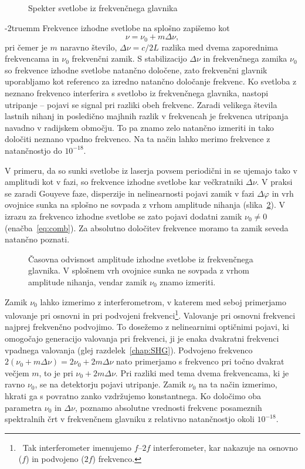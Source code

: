 \begin{figure}[ht]
\centering
\def\svgwidth{100truemm} 

\caption{Spekter svetlobe iz frekvenčnega glavnika}
\label{fig:comb}
\end{figure}
\vglue-2truemm
Frekvence izhodne svetlobe na splošno zapišemo kot 
\begin{equation}
\nu = \nu_0 + m\Delta \nu,
\label{eq:comb}
\end{equation}
pri čemer je $m$ naravno število, $\Delta \nu = c/2L$ razlika med dvema zaporednima 
frekvencama in $\nu_0$ frekvenčni zamik. S stabilizacijo $\Delta \nu$ in 
frekvenčnega zamika $\nu_0$ so frekvence izhodne svetlobe  
natančno določene, zato frekvenčni glavnik uporabljamo kot referenco 
za izredno natančno določanje frekvenc. Ko svetloba z neznano frekvenco
interferira s svetlobo iz frekvenčnega glavnika, nastopi utripanje -- pojavi
se signal pri razliki obeh frekvenc. Zaradi velikega števila lastnih nihanj 
in posledično majhnih razlik v frekvencah je frekvenca utripanja navadno v 
radijskem območju. To pa znamo zelo natančno izmeriti in tako določiti neznano 
vpadno frekvenco. Na ta način lahko merimo frekvence z natančnostjo do 
$10^{-18}$.

V primeru, da so sunki svetlobe iz laserja povsem periodični in se ujemajo tako
v amplitudi kot v fazi, so frekvence izhodne svetlobe kar 
večkratniki $\Delta \nu$. V praksi se zaradi Gouyeve faze,
disperzije in nelinearnosti pojavi zamik
v fazi $\Delta \varphi$ in vrh ovojnice sunka na splošno ne sovpada z vrhom amplitude
nihanja (slika~\ref{fig:comb2}). V izrazu za
frekvenco izhodne svetlobe se zato pojavi dodatni zamik $\nu_0 \neq 0$ (enačba~\ref{eq:comb}). 
Za absolutno
določitev frekvence moramo ta zamik seveda natančno poznati. 
\begin{figure}[ht]
\centering
\def\svgwidth{110truemm} 

\caption{Časovna odvisnost amplitude izhodne svetlobe iz frekvenčnega glavnika. V splošnem
vrh ovojnice sunka ne sovpada z vrhom amplitude nihanja, vendar zamik $\nu_0$ znamo izmeriti.}
\label{fig:comb2}
\end{figure}

Zamik $\nu_0$ lahko izmerimo
z interferometrom, v katerem med seboj primerjamo valovanje pri 
osnovni in pri podvojeni frekvenci\footnote{~Tak interferometer imenujemo $f$--$2f$
interferometer, kar nakazuje na osnovno ($f$)  in podvojeno ($2f$) frekvenco.}.
Valovanje pri osnovni frekvenci najprej frekvenčno podvojimo. To dosežemo 
z nelinearnimi optičnimi pojavi, ki omogočajo generacijo valovanja pri frekvenci, 
ji je enaka dvakratni frekvenci vpadnega valovanja 
(glej razdelek~\ref{chap:SHG}). Podvojeno frekvenco $2(\nu_0 + 
m\Delta \nu)= 2\nu_0 + 2m\Delta \nu$ nato primerjamo s frekvenco pri 
točno dvakrat večjem $m$, to je pri $\nu_0 + 2m\Delta \nu$. Pri razliki med tema
dvema frekvencama, ki je ravno $\nu_0$, se na detektorju pojavi utripanje.
Zamik $\nu_0$ na ta način izmerimo, hkrati ga s povratno zanko
vzdržujemo konstantnega. Ko določimo oba parametra $\nu_0$ in $\Delta \nu$, 
poznamo absolutne vrednosti frekvenc posameznih spektralnih črt v frekvenčnem 
glavniku z relativno natančnostjo okoli $10^{-18}$.

